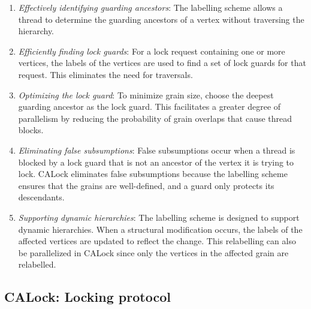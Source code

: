 \begin{enumerate}
    \item \emph{Effectively identifying guarding ancestors}: The labelling scheme allows a thread to determine the guarding ancestors of a vertex without traversing the hierarchy.
    \item \emph{Efficiently finding lock guards}: For a lock request containing one or more vertices, the labels of the vertices are used to find a set of lock guards for that request. This eliminates the need for traversals. 
    \item \emph{Optimizing the lock guard}: To minimize grain size, choose the deepest guarding ancestor as the lock guard. This facilitates a greater degree of parallelism by reducing the probability of grain overlaps that cause thread blocks.
    \item \emph{Eliminating false subsumptions}: False subsumptions occur when a thread is blocked by a lock guard that is not an ancestor of the vertex it is trying to lock. CALock eliminates false subsumptions because the labelling scheme ensures that the grains are well-defined, and a guard only protects its descendants.
    \item \emph{Supporting dynamic hierarchies}: The labelling scheme is designed to support dynamic hierarchies. When a structural modification occurs, the labels of the affected vertices are updated to reflect the change. This relabelling can also be parallelized in CALock since only the vertices in the affected grain are relabelled. 
\end{enumerate}


\subsection{CALock: Locking protocol}

